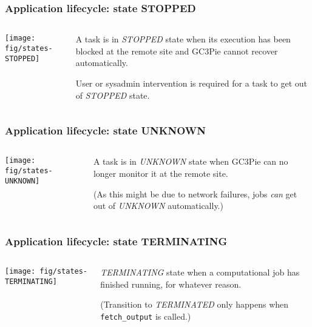 \documentclass[english,serif,mathserif,xcolor=pdftex,dvipsnames,table]{beamer}
\begin{document}
\begin{frame}[fragile]
\frametitle{Application lifecycle: state STOPPED}

\begin{columns}[c]
  \begin{column}{0.5\textwidth}
    \texttt{[image: fig/states-STOPPED]}
  \end{column}
  \begin{column}{0.5\textwidth}
    \raggedleft
    A task is in \emph{STOPPED} state when its execution has been
    blocked at the remote site and GC3Pie cannot recover
    automatically.

    \+
    User or sysadmin intervention is required for a task to get out
    of \emph{STOPPED} state.
  \end{column}
\end{columns}
\end{frame}


\begin{frame}[fragile]
\frametitle{Application lifecycle: state UNKNOWN}

\begin{columns}[c]
  \begin{column}{0.5\textwidth}
    \texttt{[image: fig/states-UNKNOWN]}
  \end{column}
  \begin{column}{0.5\textwidth}
    \raggedleft
    A task is in \emph{UNKNOWN} state when GC3Pie can no
    longer monitor it at the remote site.

    \+
    (As this might be due to network failures, jobs \emph{can} get
    out of \emph{UNKNOWN} automatically.)
  \end{column}
\end{columns}
\end{frame}


\begin{frame}[fragile]
\frametitle{Application lifecycle: state TERMINATING}

\begin{columns}[c]
  \begin{column}{0.5\textwidth}
    \texttt{[image: fig/states-TERMINATING]}
  \end{column}
  \begin{column}{0.5\textwidth}
    \raggedleft
    \emph{TERMINATING} state when a computational job has finished
    running, for whatever reason.

    \+
    (Transition to \emph{TERMINATED} only happens when \texttt{fetch\_output} is called.)
  \end{column}
\end{columns}
\end{frame}
\end{document}
